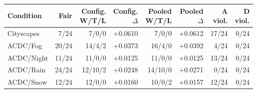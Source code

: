 \begin{tabular}{@{}lrrrrrrr@{}}
\toprule
Condition & Fair & Config. W/T/L & Config. $\Delta$ & Pooled W/T/L & Pooled $\Delta$ & A viol. & D viol. \\
\midrule
Cityscapes & 7/24 & 7/0/0 & +0.0610 & 7/0/0 & +0.0612 & 17/24 & 0/24 \\
ACDC/Fog & 20/24 & 14/4/2 & +0.0373 & 16/4/0 & +0.0392 & 4/24 & 0/24 \\
ACDC/Night & 11/24 & 11/0/0 & +0.0125 & 11/0/0 & +0.0125 & 13/24 & 0/24 \\
ACDC/Rain & 24/24 & 12/10/2 & +0.0248 & 14/10/0 & +0.0271 & 0/24 & 0/24 \\
ACDC/Snow & 12/24 & 12/0/0 & +0.0160 & 10/0/2 & +0.0157 & 12/24 & 0/24 \\
\bottomrule
\end{tabular}
